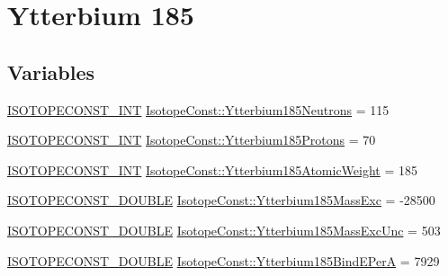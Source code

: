 \hypertarget{group___isotope_const-_ytterbium-_yb185}{}\section{Ytterbium 185}
\label{group___isotope_const-_ytterbium-_yb185}
\subsection*{Variables}
\begin{DoxyCompactItemize}
\item 
\mbox{\hyperlink{group___isotope_const-_macros_ga5f18360b3e99483a35c32d789e62621c}{I\+S\+O\+T\+O\+P\+E\+C\+O\+N\+S\+T\+\_\+\+I\+NT}} \mbox{\hyperlink{group___isotope_const-_ytterbium-_yb185_ga4b59826d8e07e45e356f73cd27270b8a}{Isotope\+Const\+::\+Ytterbium185\+Neutrons}} = 115
\item 
\mbox{\hyperlink{group___isotope_const-_macros_ga5f18360b3e99483a35c32d789e62621c}{I\+S\+O\+T\+O\+P\+E\+C\+O\+N\+S\+T\+\_\+\+I\+NT}} \mbox{\hyperlink{group___isotope_const-_ytterbium-_yb185_ga44b75e1139a8a23ae4d4333cb650d319}{Isotope\+Const\+::\+Ytterbium185\+Protons}} = 70
\item 
\mbox{\hyperlink{group___isotope_const-_macros_ga5f18360b3e99483a35c32d789e62621c}{I\+S\+O\+T\+O\+P\+E\+C\+O\+N\+S\+T\+\_\+\+I\+NT}} \mbox{\hyperlink{group___isotope_const-_ytterbium-_yb185_gaaf62b395dc11be7e381138bfc9f4c618}{Isotope\+Const\+::\+Ytterbium185\+Atomic\+Weight}} = 185
\item 
\mbox{\hyperlink{group___isotope_const-_macros_ga8f45a7272ce02c0b4c65c44636ed719a}{I\+S\+O\+T\+O\+P\+E\+C\+O\+N\+S\+T\+\_\+\+D\+O\+U\+B\+LE}} \mbox{\hyperlink{group___isotope_const-_ytterbium-_yb185_gaf190add31e400df8db3e66be33acfe70}{Isotope\+Const\+::\+Ytterbium185\+Mass\+Exc}} = -\/28500
\item 
\mbox{\hyperlink{group___isotope_const-_macros_ga8f45a7272ce02c0b4c65c44636ed719a}{I\+S\+O\+T\+O\+P\+E\+C\+O\+N\+S\+T\+\_\+\+D\+O\+U\+B\+LE}} \mbox{\hyperlink{group___isotope_const-_ytterbium-_yb185_ga2a71bc301d617bb8d7353d213d45d3cd}{Isotope\+Const\+::\+Ytterbium185\+Mass\+Exc\+Unc}} = 503
\item 
\mbox{\hyperlink{group___isotope_const-_macros_ga8f45a7272ce02c0b4c65c44636ed719a}{I\+S\+O\+T\+O\+P\+E\+C\+O\+N\+S\+T\+\_\+\+D\+O\+U\+B\+LE}} \mbox{\hyperlink{group___isotope_const-_ytterbium-_yb185_ga378e1198d6ea0836e1f8b2474cabb8aa}{Isotope\+Const\+::\+Ytterbium185\+Bind\+E\+PerA}} = 7929
\item 

\end{DoxyCompactItemize}
